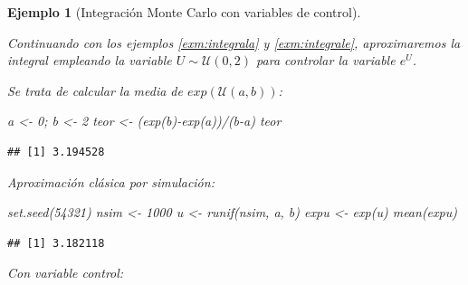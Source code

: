 \documentclass[
]{book}
\newenvironment{Shaded}{\begin{snugshade}}{\end{snugshade}}
\newcommand{\AttributeTok}[1]{\textcolor[rgb]{0.77,0.63,0.00}{#1}}
\newcommand{\DecValTok}[1]{\textcolor[rgb]{0.00,0.00,0.81}{#1}}
\newcommand{\FunctionTok}[1]{\textcolor[rgb]{0.00,0.00,0.00}{#1}}
\newcommand{\NormalTok}[1]{#1}
\newcommand{\OtherTok}[1]{\textcolor[rgb]{0.56,0.35,0.01}{#1}}
\newcommand{\SpecialCharTok}[1]{\textcolor[rgb]{0.00,0.00,0.00}{#1}}
\newcommand{\StringTok}[1]{\textcolor[rgb]{0.31,0.60,0.02}{#1}}
\theoremstyle{break}
\newtheorem{example}{Ejemplo}[chapter]
\theoremstyle{nonumberplain}
\begin{document}
\begin{example}[Integración Monte Carlo con variables de control]
\protect\hypertarget{exm:integral-contr}{}\label{exm:integral-contr}

Continuando con los ejemplos \ref{exm:integrala} y \ref{exm:integrale}, aproximaremos la integral empleando la variable \(U\sim\mathcal{U}(0,2)\) para controlar la variable \(e^{U}\).

Se trata de calcular la media de \(exp(\mathcal{U}(a,b))\):

\begin{Shaded}
\begin{Highlighting}[]
\NormalTok{a }\OtherTok{\textless{}{-}} \DecValTok{0}\NormalTok{; b }\OtherTok{\textless{}{-}} \DecValTok{2}
\NormalTok{teor }\OtherTok{\textless{}{-}}\NormalTok{ (}\FunctionTok{exp}\NormalTok{(b)}\SpecialCharTok{{-}}\FunctionTok{exp}\NormalTok{(a))}\SpecialCharTok{/}\NormalTok{(b}\SpecialCharTok{{-}}\NormalTok{a)}
\NormalTok{teor}
\end{Highlighting}
\end{Shaded}

\begin{verbatim}
## [1] 3.194528
\end{verbatim}

Aproximación clásica por simulación:

\begin{Shaded}
\begin{Highlighting}[]
\FunctionTok{set.seed}\NormalTok{(}\DecValTok{54321}\NormalTok{)}
\NormalTok{nsim }\OtherTok{\textless{}{-}} \DecValTok{1000}
\NormalTok{u }\OtherTok{\textless{}{-}} \FunctionTok{runif}\NormalTok{(nsim, a, b)}
\NormalTok{expu }\OtherTok{\textless{}{-}} \FunctionTok{exp}\NormalTok{(u)}
\FunctionTok{mean}\NormalTok{(expu) }
\end{Highlighting}
\end{Shaded}

\begin{verbatim}
## [1] 3.182118
\end{verbatim}

Con variable control:

\begin{Shaded}
\end{Shaded}


\end{example}
\end{document}
